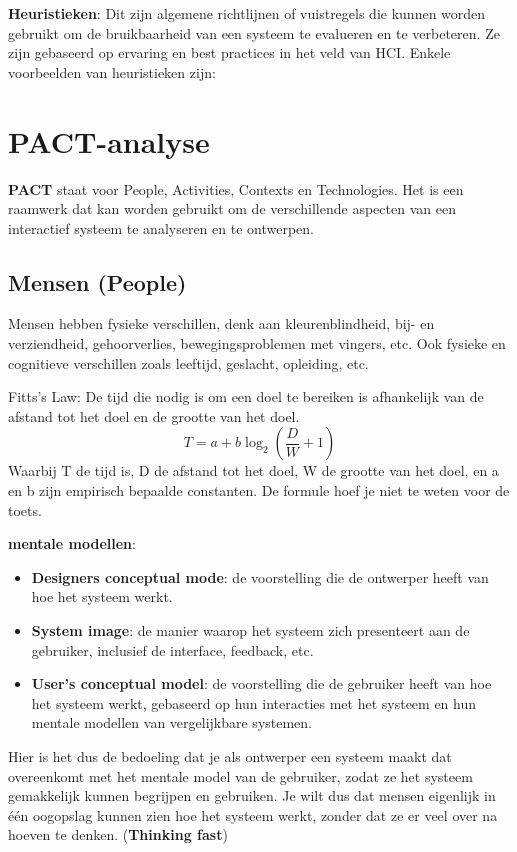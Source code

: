\documentclass[nonacm, sigconf, balance=true]{acmart}
\begin{document}
    \textbf{Heuristieken}: Dit zijn algemene richtlijnen of vuistregels die kunnen worden gebruikt om de bruikbaarheid van een systeem te evalueren en te verbeteren.
    Ze zijn gebaseerd op ervaring en best practices in het veld van HCI.
    Enkele voorbeelden van heuristieken zijn:


    \section{PACT-analyse}
    \textbf{PACT} staat voor People, Activities, Contexts en Technologies.
    Het is een raamwerk dat kan worden gebruikt om de verschillende aspecten van een interactief systeem te analyseren en te ontwerpen.

    \subsection{Mensen (People)}
    Mensen hebben fysieke verschillen, denk aan kleurenblindheid, bij- en verziendheid, gehoorverlies, bewegingsproblemen met vingers, etc.
    Ook fysieke en cognitieve verschillen zoals leeftijd, geslacht, opleiding, etc.

    Fitts's Law: De tijd die nodig is om een doel te bereiken is afhankelijk van de afstand tot het doel en de grootte van het doel.
    \[T = a + b \log_2(\frac{D}{W} + 1)\]
    Waarbij T de tijd is, D de afstand tot het doel, W de grootte van het doel, en a en b zijn empirisch bepaalde constanten.
    De formule hoef je niet te weten voor de toets.

    \textbf{mentale modellen}:
    \begin{itemize}
        \item \textbf{Designers conceptual mode}: de voorstelling die de ontwerper heeft van hoe het systeem werkt.
        \item \textbf{System image}: de manier waarop het systeem zich presenteert aan de gebruiker, inclusief de interface, feedback, etc.
        \item \textbf{User's conceptual model}: de voorstelling die de gebruiker heeft van hoe het systeem werkt, gebaseerd op hun interacties met het systeem en hun mentale modellen van vergelijkbare systemen.
    \end{itemize}

    Hier is het dus de bedoeling dat je als ontwerper een systeem maakt dat overeenkomt met het mentale model van de gebruiker, zodat ze het systeem gemakkelijk kunnen begrijpen en gebruiken.
    Je wilt dus dat mensen eigenlijk in één oogopslag kunnen zien hoe het systeem werkt, zonder dat ze er veel over na hoeven te denken. (\textbf{Thinking fast})
\end{document}
